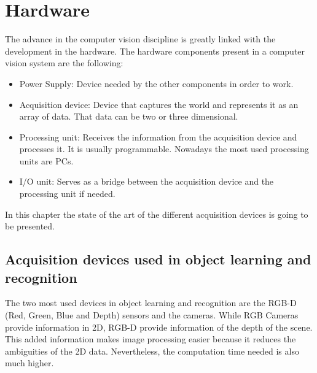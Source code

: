 \section{Hardware}
\label{hardware}
The advance in the computer vision discipline is greatly linked with the development in the hardware. 
The hardware components present in a computer vision system are the following: 

\begin{itemize}
	\item{Power Supply:} Device needed by the other components in order to work. 
	\item{Acquisition device:} Device that captures the world and represents it as an array of data. That data can be two or three dimensional. 
	\item{Processing unit:} Receives the information from the acquisition device and processes it. It is usually programmable. Nowadays the most used processing units are PCs. 
	\item{I/O unit:} Serves as a bridge between the acquisition device and the processing unit if needed. 

\end{itemize}

In this chapter the state of the art of the different acquisition devices is going to be presented. 

\subsection{Acquisition devices used in object learning and recognition}
The two most used devices in object learning and recognition are the RGB-D (Red, Green, Blue and Depth) sensors and the cameras. 
While RGB Cameras provide information in 2D, RGB-D provide information of the depth of the scene.
This added information makes image processing easier because it reduces the ambiguities of the 2D data. 
Nevertheless, the computation time needed is also much higher. 
\\

